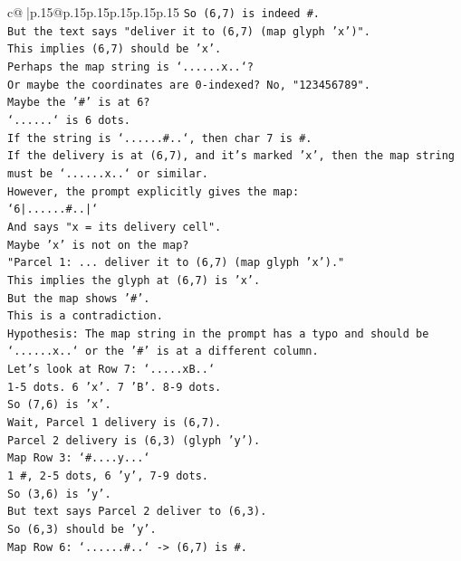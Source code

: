 \documentclass{article}
\begin{document}
{\begin{supertabular}{c@{$\;$}|p{.15\linewidth}@{}p{.15\linewidth}p{.15\linewidth}p{.15\linewidth}p{.15\linewidth}p{.15\linewidth}}
{{{\texttt{So (6,7) is indeed \#.} \\
\texttt{But the text says "deliver it to (6,7) (map glyph 'x')".} \\
\texttt{This implies (6,7) should be 'x'.} \\
\texttt{Perhaps the map string is `......x..`?} \\
\texttt{Or maybe the coordinates are 0{-}indexed? No, "123456789".} \\
\texttt{Maybe the '\#' is at 6?} \\
\texttt{`......` is 6 dots.} \\
\texttt{If the string is `......\#..`, then char 7 is \#.} \\
\texttt{If the delivery is at (6,7), and it's marked 'x', then the map string must be `......x..` or similar.} \\
\texttt{However, the prompt explicitly gives the map:} \\
\texttt{`6|......\#..|`} \\
\texttt{And says "x = its delivery cell".} \\
\texttt{Maybe 'x' is not on the map?} \\
\texttt{"Parcel 1: ... deliver it to (6,7) (map glyph 'x')."} \\
\texttt{This implies the glyph at (6,7) is 'x'.} \\
\texttt{But the map shows '\#'.} \\
\texttt{This is a contradiction.} \\
\texttt{Hypothesis: The map string in the prompt has a typo and should be `......x..` or the '\#' is at a different column.} \\
\texttt{Let's look at Row 7: `.....xB..`} \\
\texttt{1{-}5 dots. 6 'x'. 7 'B'. 8{-}9 dots.} \\
\texttt{So (7,6) is 'x'.} \\
\texttt{Wait, Parcel 1 delivery is (6,7).} \\
\texttt{Parcel 2 delivery is (6,3) (glyph 'y').} \\
\texttt{Map Row 3: `\#....y...`} \\
\texttt{1 \#, 2{-}5 dots, 6 'y', 7{-}9 dots.} \\
\texttt{So (3,6) is 'y'.} \\
\texttt{But text says Parcel 2 deliver to (6,3).} \\
\texttt{So (6,3) should be 'y'.} \\
\texttt{Map Row 6: `......\#..` {-}> (6,7) is \#.} \\
}}}
\end{supertabular}}
\end{document}
